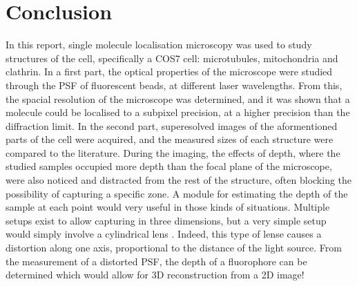 \section{Conclusion}
In this report, single molecule localisation microscopy was used to study structures of the cell, specifically a COS7 cell: microtubules, mitochondria and clathrin. In a first part, the optical properties of the microscope were studied through the PSF of fluorescent beads, at different laser wavelengths. From this, the spacial resolution of the microscope was determined, and it was shown that a molecule could be localised to a subpixel precision, at a higher precision than the diffraction limit. In the second part, superesolved images of the aformentioned parts of the cell were acquired, and the measured sizes of each structure were compared to the literature.
During the imaging, the effects of depth, where the studied samples occupied more depth than the focal plane of the microscope, were also noticed and distracted from the rest of the structure, often blocking the possibility of capturing a specific zone. A module for estimating the depth of the sample at each point would very useful in those kinds of situations. Multiple setups exist to allow capturing in three dimensions, but a very simple setup would simply involve a cylindrical lens \cite{jimenez_about_2020}. Indeed, this type of lense causes a distortion along one axis, proportional to the distance of the light source. From the measurement of a distorted PSF, the depth of a fluorophore can be determined which would allow for 3D reconstruction from a 2D image!